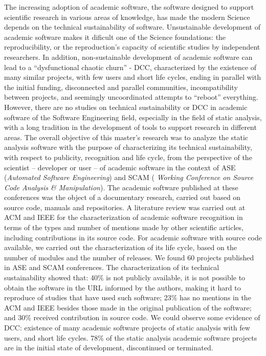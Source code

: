 The increasing adoption of academic software, the software designed to
support scientific research in various areas of knowledge, has made the
modern Science depends on the technical sustainability of software.
%
Unsustainable development of academic software makes it dificult one of the
Science foundations: the reproducibility, or the reproduction's capacity of
scientific studies by independent researchers.
%
In addition, non-sustainable development of academic software can lead to a
``dysfunctional chaotic churn'' - DCC, characterized by the existence of many
similar projects, with few users and short life cycles, ending in parallel with
the initial funding, disconnected and parallel communities, incompatibility
between projects, and seemingly uncoordinated attempts to ``reboot''
everything.
%
However, there are no studies on technical sustainability or DCC in academic
software of the Software Engineering field, especially in the field of static
analysis, with a long tradition in the development of tools to support research
in different areas.
%
The overall objective of this master's research was to analyze the static
analysis software with the purpose of characterizing its technical
sustainability, with respect to publicity, recognition and life cycle, from the
perspective of the scientist -- developer or user -- of academic software in
the context of ASE ({\it Automated Software Engineering}) and SCAM ({\it
Working Conference on Source Code Analysis \& Manipulation}).
%
The academic software published at these conferences was the object of a
documentary research, carried out based on source code, manuals and
repositories.
%
A literature review was carried out at ACM and IEEE for the characterization of
academic software recognition in terms of the types and number of mentions made
by other scientific articles, including contributions in its source code.
%
For academic software with source code available, we carried out the
characterization of its life cycle, based on the number of modules and the
number of releases.
%
We found 60 projects published in ASE and SCAM conferences.
%
The characterization of its technical sustainability showed that: 40\% is not
publicly available, it is not possible to obtain the software in the URL
informed by the authors, making it hard to reproduce of studies that have used
such software;
%
23\% has no mentions in the ACM and IEEE besides those made in the original
publication of the software; and 30\% received contribution in source code.
%
We could observe some evidence of DCC: existence of many academic software
projects of static analysis with few users, and short life cycles.
%
78\% of the static analysis academic software projects are in the initial state
of development, discontinued or terminated.
